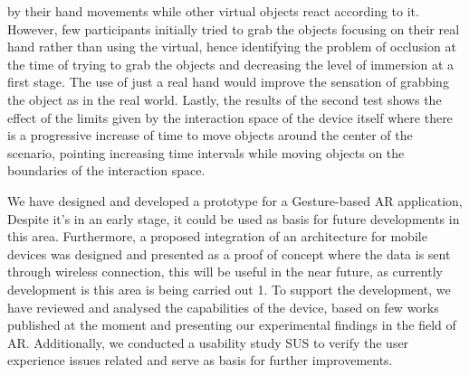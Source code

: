 by their hand movements while other virtual objects react according to it. However, few participants initially tried to grab the objects focusing on their real hand rather than using the virtual, hence identifying the problem of occlusion at the time of trying to grab the objects and decreasing the level of immersion at a first stage. The use of just a real hand would improve the sensation of grabbing the object as in the real world. Lastly, the results of the second test shows the effect of the limits given by the interaction space of the device itself where there is a progressive increase of time to move objects around the center of the scenario, pointing increasing time intervals while moving objects on the boundaries of the interaction space.





We have designed and developed a prototype for a Gesture-based AR application, Despite it’s in an early stage, it could be used as basis for future developments in this area. Furthermore, a proposed integration of an architecture for mobile devices was designed and presented as a proof of concept where the data is sent through wireless connection, this will be useful in the near future, as currently development is this area is being carried out 1. To support the development, we have reviewed and analysed the capabilities of the device, based on few works published at the moment and presenting our experimental findings in the field of AR. Additionally, we conducted a usability study SUS to verify the user experience issues related and serve as basis for further improvements.

